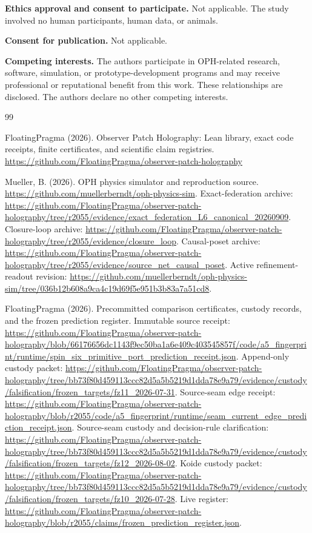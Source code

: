 \documentclass[11pt]{article}
\theoremstyle{definition}
\theoremstyle{remark}
\begin{document}
\noindent\textbf{Ethics approval and consent to participate.}
Not applicable. The study involved no human participants, human data, or
animals.

\noindent\textbf{Consent for publication.}
Not applicable.

\noindent\textbf{Competing interests.}
The authors participate in OPH-related research, software, simulation, or
prototype-development programs and may receive professional or reputational
benefit from this work. These relationships are disclosed. The authors declare
no other competing interests.

{\footnotesize
{}
\begin{thebibliography}{99}
\setlength{\itemsep}{0pt}\setlength{\parsep}{0pt}

FloatingPragma (2026). Observer Patch Holography: Lean library, exact code
receipts, finite certificates, and scientific claim registries.
\url{https://github.com/FloatingPragma/observer-patch-holography}

Mueller, B. (2026). OPH physics simulator and reproduction source.
\url{https://github.com/muellerberndt/oph-physics-sim}.
Exact-federation archive:
\url{https://github.com/FloatingPragma/observer-patch-holography/tree/r2055/evidence/exact_federation_L6_canonical_20260909}.
Closure-loop archive:
\url{https://github.com/FloatingPragma/observer-patch-holography/tree/r2055/evidence/closure_loop}.
Causal-poset archive:
\url{https://github.com/FloatingPragma/observer-patch-holography/tree/r2055/evidence/source_net_causal_poset}.
Active refinement-readout revision:
\url{https://github.com/muellerberndt/oph-physics-sim/tree/036b12b608a9ca4c19d69f5e951b3b83a7a51cd8}.

FloatingPragma (2026). Precommitted comparison certificates, custody
records, and the frozen prediction register.
Immutable source receipt:
\url{https://github.com/FloatingPragma/observer-patch-holography/blob/66176656dc1143f9ec50ba1a6e409c403545857f/code/a5_fingerprint/runtime/spin_six_primitive_port_prediction_receipt.json}.
Append-only custody packet:
\url{https://github.com/FloatingPragma/observer-patch-holography/tree/bb73f80d459113ccc82d5a5b5219d1dda78e9a79/evidence/custody/falsification/frozen_targets/fz11_2026-07-31}.
Source-seam edge receipt:
\url{https://github.com/FloatingPragma/observer-patch-holography/blob/r2055/code/a5_fingerprint/runtime/seam_current_edge_prediction_receipt.json}.
Source-seam custody and decision-rule clarification:
\url{https://github.com/FloatingPragma/observer-patch-holography/tree/bb73f80d459113ccc82d5a5b5219d1dda78e9a79/evidence/custody/falsification/frozen_targets/fz12_2026-08-02}.
Koide custody packet:
\url{https://github.com/FloatingPragma/observer-patch-holography/tree/bb73f80d459113ccc82d5a5b5219d1dda78e9a79/evidence/custody/falsification/frozen_targets/fz10_2026-07-28}.
Live register:
\url{https://github.com/FloatingPragma/observer-patch-holography/blob/r2055/claims/frozen_prediction_register.json}.


\end{thebibliography}}
\end{document}
